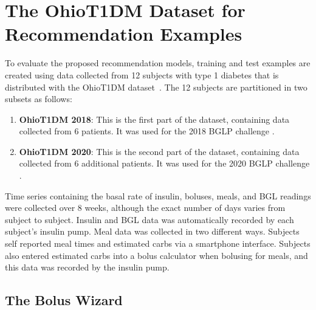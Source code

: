 \chapter{The OhioT1DM Dataset for Recommendation Examples}
\label{chapter:data}


To evaluate the proposed recommendation models, training and test examples are created using data collected from 12 subjects with type 1 diabetes that is distributed with the OhioT1DM dataset~\cite{ohiot1dm:marling:kdh20}. The 12 subjects are partitioned in two subsets as follows:
\begin{enumerate}
    \item {\bf OhioT1DM 2018}: This is the first part of the dataset, containing data collected from 6 patients. It was used for the 2018 \ac{BGLP} challenge \cite{kdh-2018-proceedings}.
    \item {\bf OhioT1DM 2020}: This is the second part of the dataset, containing data collected from 6 additional patients. It was used for the 2020 \ac{BGLP} challenge \cite{kdh-2020-proceedings}.
\end{enumerate}
Time series containing the basal rate of insulin, boluses, meals, and \ac{BGL} readings were collected over 8 weeks, although the exact number of days varies from subject to subject. 
Insulin and \ac{BGL} data was automatically recorded by each subject's insulin pump.  Meal data was collected in two different ways.  Subjects self reported meal times and estimated carbs via a smartphone interface.  Subjects also entered estimated carbs into a bolus calculator when bolusing for meals, and this data was recorded by the insulin pump.

\section{The Bolus Wizard}
\label{sec:bw}

